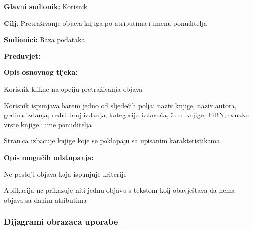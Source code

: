                     \noindent {}
					\begin{packed_item}
	
						\item \textbf{Glavni sudionik: } Korisnik
						\item  \textbf{Cilj:} Pretraživanje objava knjiga po atributima i imenu ponuditelja
						\item  \textbf{Sudionici:} Baza podataka
						\item  \textbf{Preduvjet:} - 
						\item  \textbf{Opis osnovnog tijeka:}
						
						\item[] \begin{packed_enum}
	
							\item Korisnik klikne na opciju pretraživanja objava
							\item Korisnik ispunjava barem jedno od sljedećih polja: naziv knjige, naziv autora, godina izdanja, redni broj izdanja, kategorija izdavača, žanr knjige, ISBN, oznaka vrste knjige i ime ponuditelja
                            					\item Stranica izbacuje knjige koje se poklapaju sa upisanim karakteristikama
						\end{packed_enum}
						
						\item  \textbf{Opis mogućih odstupanja: }
						
						\item[] \begin{packed_item}
	
							\item[2.a] Ne postoji objava koja ispunjuje kriterije
							\item[] \begin{packed_enum}
								
								\item Aplikacija ne prikazuje niti jednu objavu s tekstom koij obavještava da nema objava sa danim atributima 
							\end{packed_enum}
                            					
						\end{packed_item}
					\end{packed_item}

				\eject	
				
				\subsubsection{Dijagrami obrazaca uporabe}
					
